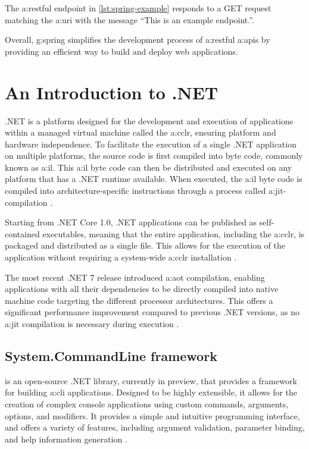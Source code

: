 The \gls{a:rest}ful endpoint in \cref{lst:spring-example} responds to a GET request matching the \gls{a:uri}  with the message \enquote{This is an example endpoint.}.

Overall, \gls{g:spring} simplifies the development process of \gls{a:rest}ful \glspl{a:api} by providing an efficient way to build and deploy web applications.

\section{An Introduction to .NET}\label{sec:tf-dotnet}

.NET is a platform designed for the development and execution of applications within a managed virtual machine called the \gls{a:cclr}, ensuring platform and hardware independence. To facilitate the execution of a single .NET application on multiple platforms, the source code is first compiled into byte code, commonly known as \gls{a:il}. This \gls{a:il} byte code can then be distributed and executed on any platform that has a .NET runtime available. When executed, the \gls{a:il} byte code is compiled into architecture-specific instructions through a process called \gls{a:jit}-compilation \cite[9--12,290]{ecma335cli}\cite{GitHubTieredJittingDocs}.

Starting from .NET Core 1.0, .NET applications can be published as self-contained executables, meaning that the entire application, including the \gls{a:cclr}, is packaged and distributed as a single file. This allows for the execution of the application without requiring a system-wide \gls{a:cclr} installation \cite{DotnetPublishing}.

The most recent .NET 7 release introduced \gls{a:aot} compilation, enabling applications with all their dependencies to be directly compiled into native machine code targeting the different processor architectures. This offers a significant performance improvement compared to previous .NET versions, as no \gls{a:jit} compilation is necessary during execution \cite{DotnetPublishingAot}.

\subsection{System.CommandLine framework}

 is an open-source .NET library, currently in preview, that provides a framework for building \gls{a:cli} applications. Designed to be highly extensible, it allows for the creation of complex console applications using custom commands, arguments, options, and modifiers. It provides a simple and intuitive programming interface, and offers a variety of features, including argument validation, parameter binding, and help information generation \cite{DotnetSystemCommandline}\cite{DotnetSystemCommandlineGetStarted}.

